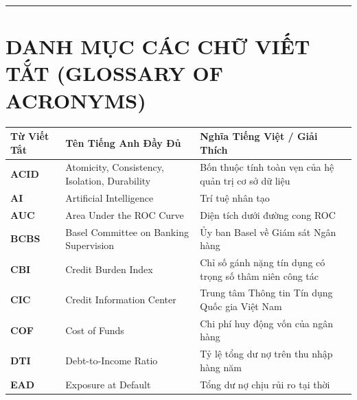 \documentclass[
  13pt,
  a4paper,
]{report}
\newcounter{none} %
\begin{document}
\newpage

\begin{center}\rule{0.5\linewidth}{0.5pt}\end{center}

\section{DANH MỤC CÁC CHỮ VIẾT TẮT (GLOSSARY OF
ACRONYMS)}\label{danh-mux1ee5c-cuxe1c-chux1eef-viux1ebft-tux1eaft-glossary-of-acronyms}

{\def\LTcaptype{none} %
\begin{longtable}[]{@{}
  >{\raggedright\arraybackslash}p{}
  >{\raggedright\arraybackslash}p{}
  >{\raggedright\arraybackslash}p{}@{}}
\toprule\noalign{}
\begin{minipage}[b]{\linewidth}\raggedright
Từ Viết Tắt
\end{minipage} & \begin{minipage}[b]{\linewidth}\raggedright
Tên Tiếng Anh Đầy Đủ
\end{minipage} & \begin{minipage}[b]{\linewidth}\raggedright
Nghĩa Tiếng Việt / Giải Thích
\end{minipage} \\
\midrule\noalign{}
\endhead
\bottomrule\noalign{}
\endlastfoot
\textbf{ACID} & Atomicity, Consistency, Isolation, Durability & Bốn
thuộc tính toàn vẹn của hệ quản trị cơ sở dữ liệu \\
\textbf{AI} & Artificial Intelligence & Trí tuệ nhân tạo \\
\textbf{AUC} & Area Under the ROC Curve & Diện tích dưới đường cong
ROC \\
\textbf{BCBS} & Basel Committee on Banking Supervision & Ủy ban Basel về
Giám sát Ngân hàng \\
\textbf{CBI} & Credit Burden Index & Chỉ số gánh nặng tín dụng có trọng
số thâm niên công tác \\
\textbf{CIC} & Credit Information Center & Trung tâm Thông tin Tín dụng
Quốc gia Việt Nam \\
\textbf{COF} & Cost of Funds & Chi phí huy động vốn của ngân hàng \\
\textbf{DTI} & Debt-to-Income Ratio & Tỷ lệ tổng dư nợ trên thu nhập
hàng năm \\
\textbf{EAD} & Exposure at Default & Tổng dư nợ chịu rủi ro tại thời

\end{longtable}}
\end{document}
